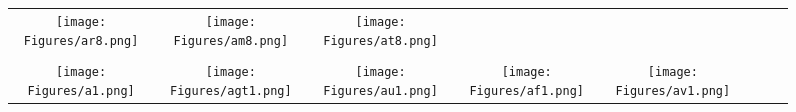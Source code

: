 \documentclass[journal]{IEEEtran}
\begin{document}
\begin{figure*}[!t]
\begin{tabular}{cccccccc}
		\hspace{0.4cm}
		\begin{minipage}{30pt}
			\texttt{[image: Figures/ar8.png]}
\end{minipage}
		&
		\hspace{0.4cm}
		\begin{minipage}{30pt}
			\texttt{[image: Figures/am8.png]}
\end{minipage}
		&
		\hspace{0.4cm}
		\begin{minipage}{30pt}
			\texttt{[image: Figures/at8.png]}
\end{minipage}
		\\
		\\
		\begin{minipage}{30pt}
			\texttt{[image: Figures/a1.png]}
\end{minipage}
		&
		\hspace{0.4cm}
		\begin{minipage}{30pt}
			\texttt{[image: Figures/agt1.png]}
\end{minipage}
		&
		\hspace{0.4cm}
		\begin{minipage}{30pt}
			\texttt{[image: Figures/au1.png]}
\end{minipage}
		&
		\hspace{0.4cm}
		\begin{minipage}{30pt}
			\texttt{[image: Figures/af1.png]}
\end{minipage}
		&
		\hspace{0.4cm}
		\begin{minipage}{30pt}
			\texttt{[image: Figures/av1.png]}
\end{minipage}
		&
	

\end{tabular}
\end{figure*}
\end{document}

